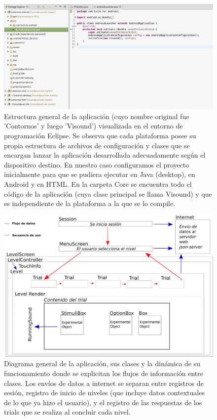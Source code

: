 \documentclass{article}
\begin{document}
    \begin{figure}
        \center
        \includegraphics[width=\textwidth]{Imagenes/Eclipse1.png}
        \caption{Estructura general de la aplicación (cuyo nombre original fue 'Contornos' y luego 'Visound') visualizada en el entorno de programación Eclipse. Se observa que cada plataforma posee su propia estructura de archivos de configuración y clases que se encargan lanzar la aplicación desarrollada adecuadamente según el dispositivo destino. En nuestro caso configuramos el proyecto inicialmente para que se pudiera ejecutar en Java (desktop), en Android y en HTML. En la carpeta Core se encuentra todo el código de la aplicación (cuya clase principal se llama Visound) y que es independiente de la plataforma a la que se lo compile.}
        \label{fig:Eclipse1}
    \end{figure}
    
    \begin{figure}
        \center
        \includegraphics[width=\textwidth]{Imagenes/FlujoJava.png}
        \caption{Diagrama general de la aplicación, sus clases y la dinámica de su funcionamiento donde se explicitan los flujos de información entre clases. Los envíos de datos a internet se separan entre registros de sesión, registro de inicio de niveles (que incluye datos contextuales de lo que ya hizo el usuario), y el registro de las respuestas de los trials que se realiza al concluir cada nivel.}
        \label{fig:Flujo}
    \end{figure}
    
\end{document}
